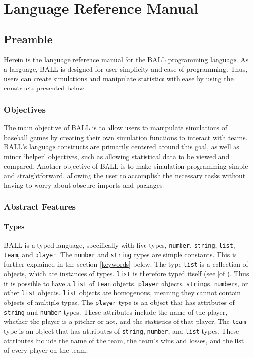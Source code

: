 
\chapter{Language Reference Manual}\label{manual}

\section{Preamble}
Herein is the language reference manual for the BALL programming language. As a language, BALL is designed for user simplicity and ease of programming. Thus, users can create simulations and manipulate statistics with ease by using the constructs presented below.  

\subsection{Objectives}
The main objective of BALL is to allow users to manipulate simulations of baseball games by creating their own simulation functions to interact with teams. BALL's language constructs are primarily centered around this goal, as well as minor `helper' objectives, such as allowing statistical data to be viewed and compared. Another objective of BALL is to make simulation programming simple and straightforward, allowing the user to accomplish the necessary tasks without having to worry about obscure imports and packages.

\subsection{Abstract Features}
\subsubsection{Types}\label{types}
BALL is a typed language, specifically with five types, \texttt{number},
\texttt{string}, \texttt{list}, \texttt{team}, and \texttt{player}. The
\texttt{number} and \texttt{string} types are simple constants. This is further
explained in the section \ref{keywords} below. The type \texttt{list} is a
collection of objects, which are instances of types. \texttt{list} is therefore
typed itself (see \ref{of}). Thus it is possible to have a \texttt{list} of
\texttt{team} objects, \texttt{player} objects, \texttt{string}s,
\texttt{number}s, or other \texttt{list} objects. \texttt{list} objects are
homogenous, meaning they cannot contain objects of multiple types. The
\texttt{player} type is an object that has attributes of \texttt{string} and
\texttt{number} types. These attributes include the name of the player, whether
the player is a pitcher or not, and the statistics of that player. The
\texttt{team} type is an object that has attributes of \texttt{string},
\texttt{number}, and \texttt{list} types. These attributes include the name of
the team, the team's wins and losses, and the list of every player on the team.

